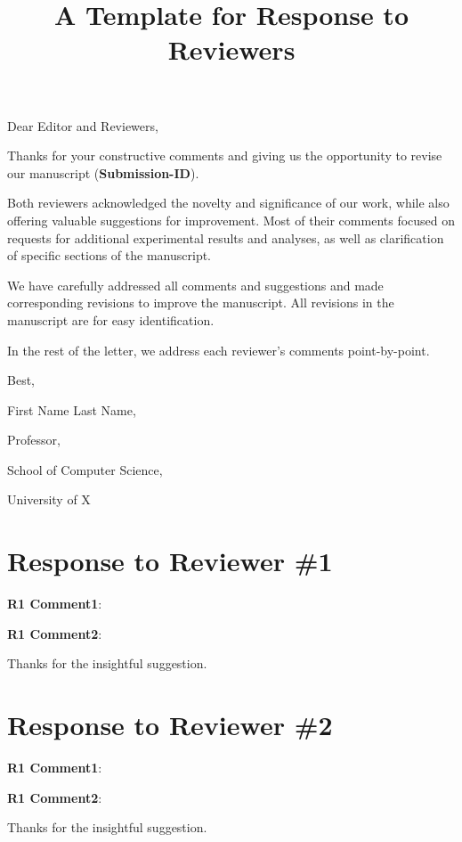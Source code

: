 \documentclass{kaiart}
\title{
    A Template for
    Response to Reviewers
}
\newcommand{\cmt}[2]{\textbf{#1}: {\color{gray}{#2}}}
\begin{document}
\maketitle


Dear Editor and Reviewers,


Thanks for your constructive comments and giving us the opportunity
to revise our manuscript (\textbf{Submission-ID}).

Both reviewers acknowledged the novelty and significance of our work, while also offering valuable suggestions for improvement.
%
Most of their comments focused on 
requests for additional experimental results 
and analyses,
as well as clarification of specific 
sections of the manuscript.


We have carefully addressed all comments and 
suggestions and made corresponding revisions 
to improve the manuscript.
%
All revisions in the manuscript are {\color{blue}{highlighted in blue}} for easy identification.


In the rest of the letter, we address each reviewer's comments point-by-point.


\vspace{3em}
Best,

First Name Last Name,

Professor,

School of Computer Science,

University of X


\clearpage
\pagebreak

\section*{Response to Reviewer \#1}
\cmt{R1 Comment1}{
    \lipsum[1]
}

\lipsum[1]

\cmt{R1 Comment2}{
    \lipsum[1]
}

\lipsum[1]

\begin{quoting}
    \lipsum[1]
\end{quoting}

Thanks for the insightful suggestion.

\lipsum[1]


\clearpage\pagebreak
\section*{Response to Reviewer \#2}
\cmt{R1 Comment1}{
    \lipsum[1]
}

\lipsum[1]

\cmt{R1 Comment2}{
    \lipsum[1]
}

\lipsum[1]

\begin{quoting}
    \lipsum[1]
\end{quoting}

Thanks for the insightful suggestion.

\lipsum[1]
~\cite{krizhevsky2012imagenet}



\end{document}
